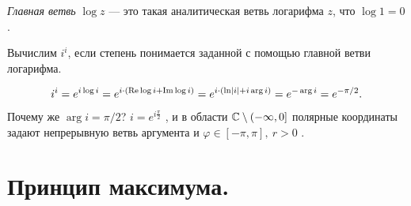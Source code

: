 \documentclass[../../main.tex]{subfiles}
\begin{document}
\begin{df}
 \textit{Главная ветвь} $ \log z $ --- это такая аналитическая ветвь логарифма $ z $, что $ \log 1 = 0 $.
\end{df}
\begin{exmpl}
 Вычислим $ i^{i} $, если степень понимается заданной с помощью главной ветви логарифма.

\begin{align*}
 i^{i} = e^{i \log i} = e^{i \cdot \left( \operatorname{Re} \log i + \operatorname{Im} \log i \right)} = e^{i \cdot \left( \ln \left| i \right| + i \arg i \right)} = e^{-\arg i} = e^{-\pi / 2}.
\end{align*} Почему же $ \arg i = \pi / 2 $?  $ i = e^{i \frac{\pi}{2}} $ , и в области $ \mathbb{C} \setminus \left(-\infty, 0\right]   $  полярные координаты задают непрерывную ветвь аргумента и $\varphi \in [-\pi, \pi], \ r > 0$ . 
\end{exmpl}

\newpage
\section{Принцип максимума.}
\end{document}
